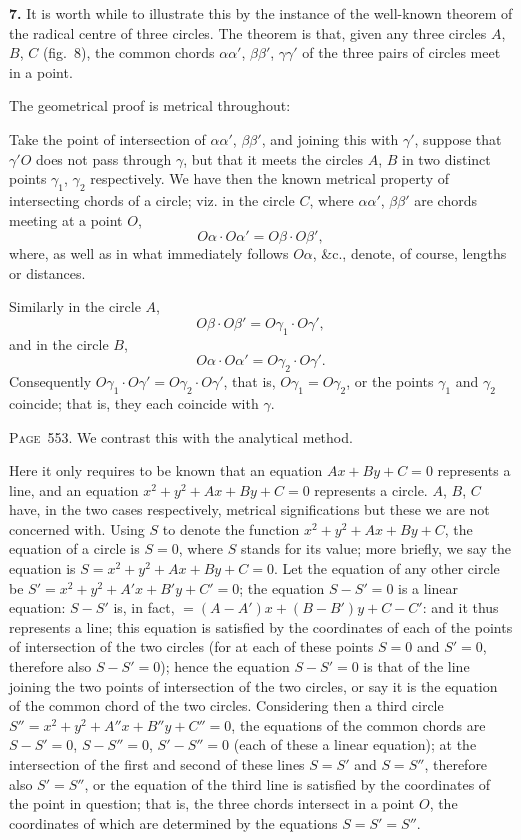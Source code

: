 \documentclass[11pt,a4paper]{book}
\begin{document}
\textbf{7.} It is worth while to illustrate this by the instance of the well-known theorem of the radical centre of three circles. The theorem is that, given any three circles $A$, $B$, $C$ (fig.~8), the common chords $\alpha\alpha'$, $\beta\beta'$, $\gamma\gamma'$ of the three pairs of circles meet in a point.

The geometrical proof is metrical throughout:

Take the point of intersection of $\alpha\alpha'$, $\beta\beta'$, and joining this with $\gamma'$, suppose that $\gamma'O$ does not pass through $\gamma$, but that it meets the circles $A$, $B$ in two distinct points $\gamma_1$, $\gamma_2$ respectively. We have then the known metrical property of intersecting chords of a circle; viz. in the circle $C$, where $\alpha\alpha'$, $\beta\beta'$ are chords meeting at a point $O$,
\[
O\alpha \cdot O\alpha' = O\beta \cdot O\beta',
\]
where, as well as in what immediately follows $O\alpha$, \&c., denote, of course, lengths or distances.

Similarly in the circle $A$,
\[
O\beta \cdot O\beta' = O\gamma_1 \cdot O\gamma',
\]
and in the circle $B$,
\[
O\alpha \cdot O\alpha' = O\gamma_2 \cdot O\gamma'.
\]
Consequently $O\gamma_1 \cdot O\gamma' = O\gamma_2 \cdot O\gamma'$, that is, $O\gamma_1 = O\gamma_2$, or the points $\gamma_1$ and $\gamma_2$ coincide; that is, they each coincide with $\gamma$.

\newpage
\noindent\textsc{Page~553.} We contrast this with the analytical method.

Here it only requires to be known that an equation $Ax+By+C=0$ represents a line, and an equation $x^2+y^2+Ax+By+C=0$ represents a circle. $A$, $B$, $C$ have, in the two cases respectively, metrical significations but these we are not concerned with. Using $S$ to denote the function $x^2+y^2+Ax+By+C$, the equation of a circle is $S=0$, where $S$ stands for its value; more briefly, we say the equation is $S=x^2+y^2+Ax+By+C=0$. Let the equation of any other circle be $S'=x^2+y^2+A'x+B'y+C'=0$; the equation $S-S'=0$ is a linear equation: $S-S'$ is, in fact, $=(A-A')x+(B-B')y+C-C'$: and it thus represents a line; this equation is satisfied by the coordinates of each of the points of intersection of the two circles (for at each of these points $S=0$ and $S'=0$, therefore also $S-S'=0$); hence the equation $S-S'=0$ is that of the line joining the two points of intersection of the two circles, or say it is the equation of the common chord of the two circles. Considering then a third circle $S''=x^2+y^2+A''x+B''y+C''=0$, the equations of the common chords are $S-S'=0$, $S-S''=0$, $S'-S''=0$ (each of these a linear equation); at the intersection of the first and second of these lines $S=S'$ and $S=S''$, therefore also $S'=S''$, or the equation of the third line is satisfied by the coordinates of the point in question; that is, the three chords intersect in a point $O$, the coordinates of which are determined by the equations $S=S'=S''$.
\end{document}
